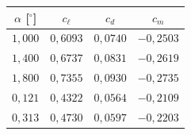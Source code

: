 \begin{tabular}{cccc}
\toprule
$\alpha$ [$^\circ$] & $c_\ell$ & $c_d$ & $c_m$ \\
\midrule
$1{,}000$ & $0{,}6093$ & $0{,}0740$ & $-0{,}2503$ \\
$1{,}400$ & $0{,}6737$ & $0{,}0831$ & $-0{,}2619$ \\
$1{,}800$ & $0{,}7355$ & $0{,}0930$ & $-0{,}2735$ \\
$0{,}121$ & $0{,}4322$ & $0{,}0564$ & $-0{,}2109$ \\
$0{,}313$ & $0{,}4730$ & $0{,}0597$ & $-0{,}2203$ \\
\bottomrule
\end{tabular}
